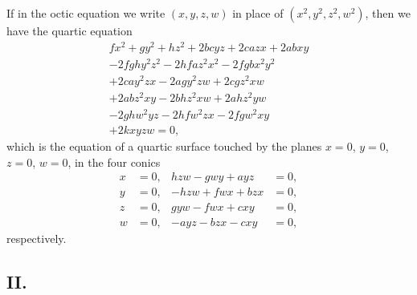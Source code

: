 \documentclass[11pt,a4paper]{book}
\begin{document}
If in the octic equation we write $(x, y, z, w)$ in place of $(x^{2}, y^{2}, z^{2}, w^{2})$, then we have the quartic equation
%
\begin{multline}
fx^{2} + gy^{2} + hz^{2} + 2bc yz + 2ca zx + 2ab xy \\
- 2fgh y^{2} z^{2} - 2hfa z^{2} x^{2} - 2fgb x^{2} y^{2} \\
+ 2cay^{2}zx - 2agy^{2}zw + 2cgz^{2}xw \\
+ 2abz^{2}xy - 2bhz^{2}xw + 2ahz^{2}yw \\
- 2ghw^{2}yz - 2hfw^{2}zx - 2fgw^{2}xy \\
+ 2kxyzw = 0,
\end{multline}
%
which is the equation of a quartic surface touched by the planes $x=0$, $y=0$, $z=0$, $w=0$, in the four conics
\begin{align*}
x&=0, & hzw - gwy + ayz &= 0, \\
y&=0, & -hzw + fwx + bzx &= 0, \\
z&=0, & gyw - fwx + cxy &= 0, \\
w&=0, & -ayz - bzx - cxy &= 0,
\end{align*}
respectively.

\subsection*{II.}
\end{document}
